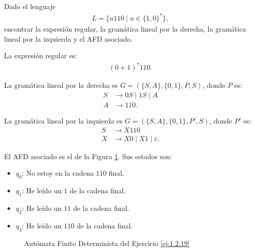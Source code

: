 \begin{ejercicio} \label{ej:1.2.19}
    Dado el lenguaje
    \begin{align*}
        L = \{u110 \mid u \in \{1, 0\}^*\},
    \end{align*}
    encontrar la expresión regular, la gramática lineal por la derecha, la gramática lineal por la izquierda y el AFD asociado.

    La expresión regular es:
    \begin{align*}
        (0+1)^*110.
    \end{align*}

    La gramática lineal por la derecha es $G=(\{S,A\}, \{0, 1\}, P, S)$, donde $P$ es:
    \begin{align*}
        S &\to 0S \mid 1S \mid A\\
        A &\to 110.
    \end{align*}

    La gramática lineal por la izquierda es $G=(\{S,A\}, \{0, 1\}, P', S)$, donde $P'$ es:
    \begin{align*}
        S &\to X110\\
        X &\to X0 \mid X1 \mid \varepsilon.
    \end{align*}

    El AFD asociado es el de la Figura \ref{fig:ej:1.2.19}. Sus estados son:
    \begin{itemize}
        \item \ul{$q_0$}: No estoy en la cadena $110$ final.
        \item \ul{$q_1$}: He leído un $1$ de la cadena final.
        \item \ul{$q_2$}: He leído un $11$ de la cadena final.
        \item \ul{$q_3$}: He leído un $110$ de la cadena final.
    \end{itemize}
    \begin{figure}
        \centering
        \caption{Autómata Finito Determinista del Ejercicio \ref{ej:1.2.19}}
        \label{fig:ej:1.2.19}
    \end{figure}
\end{ejercicio}

